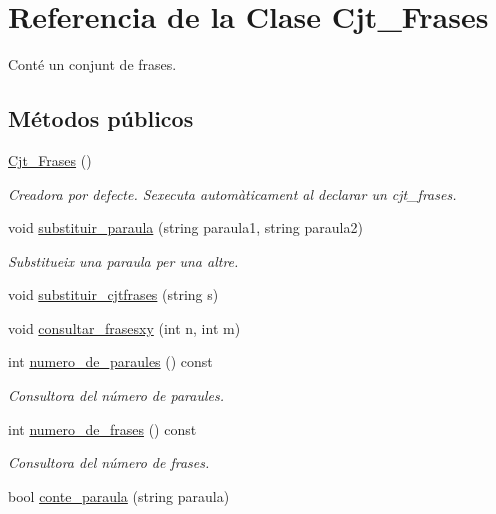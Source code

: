 \hypertarget{class_cjt___frases}{}\section{Referencia de la Clase Cjt\+\_\+\+Frases}
\label{class_cjt___frases}


Conté un conjunt de frases.  


\subsection*{Métodos públicos}
\begin{DoxyCompactItemize}
\item 
\hyperlink{class_cjt___frases_a31e716c9505cf3b9cc5add72c11f44ea}{Cjt\+\_\+\+Frases} ()
\begin{DoxyCompactList}\small\item\em Creadora por defecte. S\textquotesingle{}executa automàticament al declarar un cjt\+\_\+frases. \end{DoxyCompactList}\item 
void \hyperlink{class_cjt___frases_a2f71744b91a5d9c6077fb3e0f05048bb}{substituir\+\_\+paraula} (string paraula1, string paraula2)
\begin{DoxyCompactList}\small\item\em Substitueix una paraula per una altre. \end{DoxyCompactList}\item 
void \hyperlink{class_cjt___frases_ab61657ab1517fc6d640a80f8b54e8b83}{substituir\+\_\+cjtfrases} (string s)
\item 
void \hyperlink{class_cjt___frases_ab3f2ab417040813df6d3dee8350559d3}{consultar\+\_\+frasesxy} (int n, int m)
\item 
int \hyperlink{class_cjt___frases_a42ba9f0a302235d52ca4063dd9ef2145}{numero\+\_\+de\+\_\+paraules} () const 
\begin{DoxyCompactList}\small\item\em Consultora del número de paraules. \end{DoxyCompactList}\item 
int \hyperlink{class_cjt___frases_aaf9ad179f28ad0b4e782510c345e0cca}{numero\+\_\+de\+\_\+frases} () const 
\begin{DoxyCompactList}\small\item\em Consultora del número de frases. \end{DoxyCompactList}\item 
bool \hyperlink{class_cjt___frases_a6e45b67d225ed403aa0ce791d3bed726}{conte\+\_\+paraula} (string paraula)

\end{DoxyCompactItemize}
